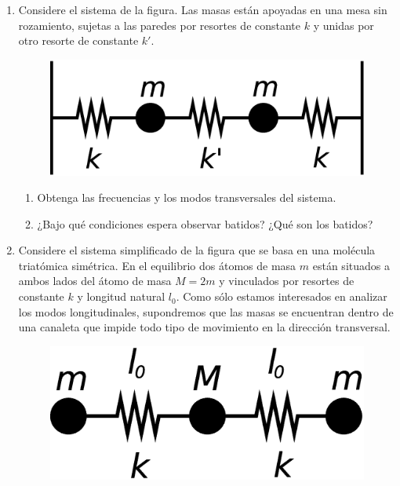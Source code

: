 \documentclass[11pt,spanish]{article}
\begin{document}
\begin{enumerate}
\begin{enumerate}
    \end{enumerate}



    \item Considere el sistema de la figura. Las masas están apoyadas en una 
    mesa sin rozamiento, sujetas a las paredes por resortes de constante $k$ y
    unidas por otro resorte de constante $k'$. 

    \begin{figure}[H]
        \centering{}\includegraphics[clip,scale=0.25]{figs/ej1-8}
    \end{figure}

    \begin{enumerate}
        \item Obtenga las frecuencias y los modos transversales del sistema. 
        \item ¿Bajo qué condiciones espera observar batidos? ¿Qué son los
        batidos?
    \end{enumerate}


    \item Considere el sistema simplificado de la figura que se basa en una
    molécula triatómica simétrica. En el equilibrio dos átomos de masa $m$
    están situados a ambos lados del átomo de masa $M=2m$ y vinculados por
    resortes de constante $k$ y longitud natural $l_{0}$. Como sólo estamos
    interesados en analizar los modos longitudinales, supondremos que las masas
    se encuentran dentro de una canaleta que impide todo tipo de movimiento en
    la dirección transversal. 

    \begin{figure}[H]
        \centering{}\includegraphics[clip,scale=0.25]{figs/ej1-9}
    \end{figure}


\end{enumerate}
\end{document}
